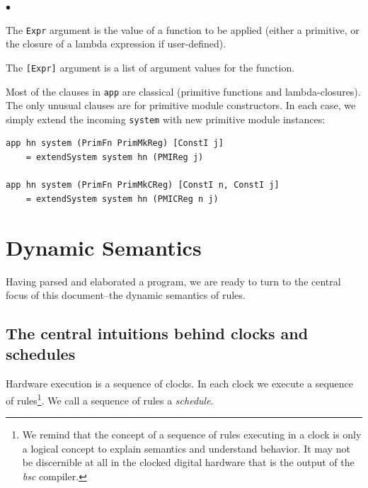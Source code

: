 \documentclass[11pt]{article}
\newenvironment{tightlist}%
{\begin{list}{$\bullet$}{%
    \setlength{\topsep}{0in}
    \setlength{\partopsep}{0in}
    \setlength{\itemsep}{0in}
    \setlength{\parsep}{0in}
    \setlength{\leftmargin}{1.5em}
    \setlength{\rightmargin}{0in}
    \setlength{\itemindent}{0in}
}
}%
{\end{list}
}
\newcommand{\term}[1]{\texttt{#1}}
\begin{document}
\begin{tightlist}

\item The \term{Expr} argument is the value of a function to be
applied (either a primitive, or the closure of a lambda expression if
user-defined).

\item The \term{[Expr]} argument is a list of argument values for the function.

\end{tightlist}

Most of the clauses in \term{app} are classical (primitive functions
and lambda-closures).  The only unusual clauses are for primitive
module constructors.  In each case, we simply extend the incoming
\term{system} with new primitive module instances:

\begin{Verbatim}[frame=single, commandchars=\\\{\}]
app hn system (PrimFn PrimMkReg) [ConstI j]
    = extendSystem system hn (PMIReg j)

app hn system (PrimFn PrimMkCReg) [ConstI n, ConstI j]
    = extendSystem system hn (PMICReg n j)
\end{Verbatim}


\section{Dynamic Semantics}

\label{sec_dynamic_semantics}

Having parsed and elaborated a program, we are ready to turn to the
central focus of this document--the dynamic semantics of rules.


\subsection{The central intuitions behind clocks and schedules}

Hardware execution is a sequence of clocks.  In each clock we execute
a sequence of rules\footnote{We remind that the concept of a sequence
of rules executing in a clock is only a logical concept to explain
semantics and understand behavior.  It may not be discernible at all
in the clocked digital hardware that is the output of the {\it bsc}
compiler.}.  We call a sequence of rules a \emph{schedule}.
\end{document}
